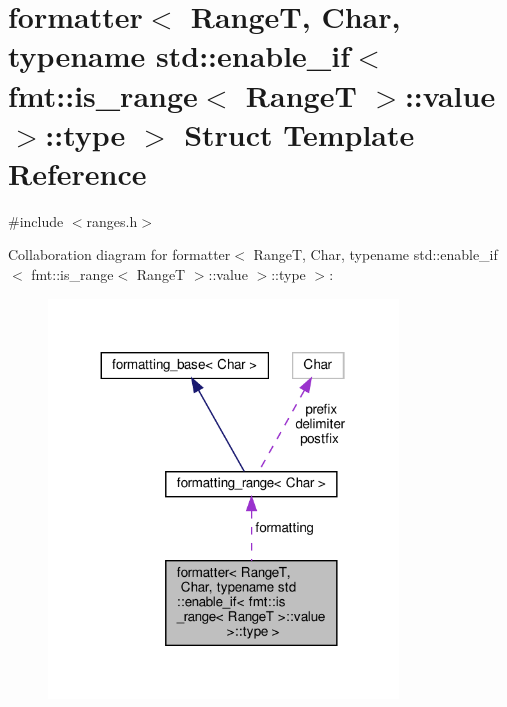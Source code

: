 \hypertarget{structformatter_3_01_range_t_00_01_char_00_01typename_01std_1_1enable__if_3_01fmt_1_1is__range_338ef07b6d6c7537efaa2c888f2ea4c8d}{}\section{formatter$<$ RangeT, Char, typename std\+:\+:enable\+\_\+if$<$ fmt\+:\+:is\+\_\+range$<$ RangeT $>$\+:\+:value $>$\+:\+:type $>$ Struct Template Reference}
\label{structformatter_3_01_range_t_00_01_char_00_01typename_01std_1_1enable__if_3_01fmt_1_1is__range_338ef07b6d6c7537efaa2c888f2ea4c8d}


{\ttfamily \#include $<$ranges.\+h$>$}



Collaboration diagram for formatter$<$ RangeT, Char, typename std\+:\+:enable\+\_\+if$<$ fmt\+:\+:is\+\_\+range$<$ RangeT $>$\+:\+:value $>$\+:\+:type $>$\+:
\nopagebreak
\begin{figure}[H]
\begin{center}
\leavevmode
\includegraphics[width=263pt]{structformatter_3_01_range_t_00_01_char_00_01typename_01std_1_1enable__if_3_01fmt_1_1is__range_3661e75947c9721c2cbca15d539fb6fbd}
\end{center}
\end{figure}
